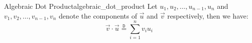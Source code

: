 \begin{definition}{Algebraic Dot Product}{algebraic_dot_product}
 Let $ u_{1} , u_{2} , \dotsc  , u_{n - 1} , u_{n}$ and $ v_{1} , v_{2} , \dotsc  , v_{n - 1} , v_{n}$ denote the components of $ \vec{u}$ and $ \vec{v}$ respectively, then we have:
\[
	\vec{v}  \cdot  \vec{u} \stackrel{\mathtt{D}}{=} \sum_{i=1}^{n} v_{i} u_{i}
\]
\end{definition}
